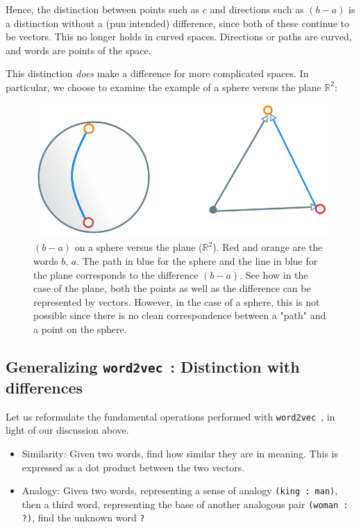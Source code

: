 \documentclass{book}
\newcommand{\wtov}{\texttt{word2vec }}
\newcommand{\R}{\ensuremath{\mathbb R}}
\begin{document}
Hence, the distinction between points such as $c$  and directions such as $(b - a)$
is a distinction without a (pun intended) difference, since both of these
continue to be vectors.  This no longer holds in curved spaces. Directions or
paths are curved, and words are points of the space.


This distinction \emph{does} make a difference for more complicated spaces.
In particular, we choose to examine the example of a sphere versus the plane 
$\mathbb R^2$:

\begin{figure}[H]
\includegraphics[width=\textwidth]{./sphere-shortest-path.png}
\caption{$(b - a)$ on a sphere versus the plane ($\R^2$). Red and
  orange are the words $b$, $a$. The path in blue for the sphere and the
  line in blue for the plane corresponds to the difference $(b - a)$. See
  how in the case of the plane, both the points as well as the difference can
  be represented by vectors. However, in the case of a sphere, this is
  not possible since there is no clean correspondence between a "path" and
  a point on the sphere.}
\end{figure}


\subsection{Generalizing \wtov: Distinction with differences}

Let us reformulate the fundamental operations performed with \wtov, in light
of our discussion above.

\begin{itemize}
\item Similarity: Given two words, find how similar they are in meaning. This is
     expressed as a dot product between the two vectors.
\item Analogy: Given two words, representing a sense of analogy \texttt{(king : man)},
      then a third word, representing the base of another analogous
      pair \texttt{(woman : ?)}, find the unknown word \texttt{?}
\end{itemize}
\end{document}
